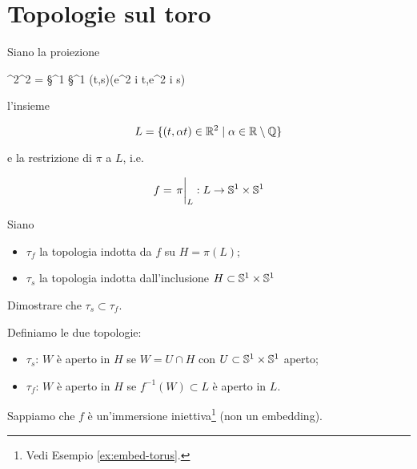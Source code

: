 %

\newpage

%

\section{Topologie sul toro}\label{es3-2}

\begin{tcolorbox}
	Siano la proiezione
	
	\map{\pi}
		{\R^{2}}{\T^{2} = \S^{1} \times \S^{1}}
		{(t,s)}{(e^{2 \pi i t},e^{2 \pi i s})}
	
	l'insieme
	
	\begin{equation}
		L = \{ (t,\alpha t) \in \R^{2} \mid \alpha \in \R \setminus \Q \}
	\end{equation}
	
	e la restrizione di $ \pi $ a $ L $, i.e.
	
	\begin{equation}
		f = \eval{\pi}_{L} : L \to \S^{1} \times \S^{1}
	\end{equation}

	Siano
	
	\begin{itemize}
		\item $ \tau_{f} $ la topologia indotta da $ f $ su $ H = \pi(L) $;
		
		\item $ \tau_{s} $ la topologia indotta dall'inclusione $ H \subset \S^{1} \times \S^{1} $
	\end{itemize}
	
	Dimostrare che $ \tau_{s} \subset \tau_{f} $.
\end{tcolorbox}

Definiamo le due topologie:

\begin{itemize}
	\item $ \tau_{s} $: $ W $ è aperto in $ H $ se $ W = U \cap H $ con $ U \subset \S^{1} \times \S^{1} $ aperto;
	
	\item $ \tau_{f} $: $ W $ è aperto in $ H $ se $ f^{-1}(W) \subset L $ è aperto in $ L $.
\end{itemize}

Sappiamo che $ f $ è un'immersione iniettiva\footnote{%
	Vedi Esempio \ref{ex:embed-torus}.%
} (non un embedding).

%

\newpage

